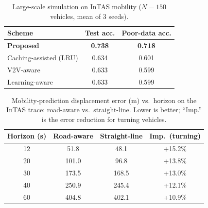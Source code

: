 \begin{table}[t]
\centering
\caption{Large-scale simulation on InTAS mobility ($N{=}150$ vehicles, mean of
3 seeds).}
\label{tab:largescale}
\setlength{\tabcolsep}{6pt}
\begin{tabular}{l cc}
\toprule
Scheme & Test acc. & Poor-data acc. \\
\midrule
\textbf{Proposed}        & \textbf{0.738} & \textbf{0.718} \\
Caching-assisted (LRU)   & 0.634 & 0.601 \\
V2V-aware                & 0.633 & 0.599 \\
Learning-aware           & 0.633 & 0.599 \\
\bottomrule
\end{tabular}
\end{table}

\begin{table}[t]
\centering
\caption{Mobility-prediction displacement error (m) vs.\ horizon on the InTAS
trace: road-aware vs.\ straight-line. Lower is better; ``Imp.'' is the error
reduction for turning vehicles.}
\label{tab:mobpred}
\setlength{\tabcolsep}{4pt}
\begin{tabular}{c cc c}
\toprule
Horizon (s) & Road-aware & Straight-line & Imp.\ (turning) \\
\midrule
12  & 51.8  & 48.1  & +15.2\% \\
20  & 101.0 & 96.8  & +13.8\% \\
30  & 173.5 & 168.5 & +13.0\% \\
40  & 250.9 & 245.4 & +12.1\% \\
60  & 404.8 & 402.1 & +10.9\% \\
\bottomrule
\end{tabular}
\end{table}

